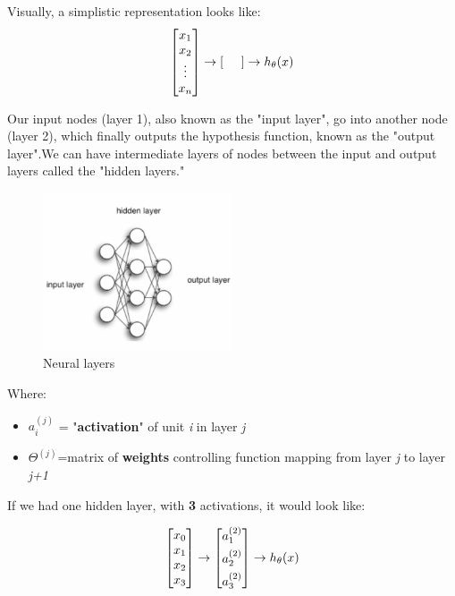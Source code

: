 \pagebreak

Visually, a simplistic representation looks like:\\

\begin{align*}
\begin{bmatrix}
x_{1} \\
x_{2} \\
\vdots \\
x_{n}
\end{bmatrix}
\rightarrow
[ \hspace{0.5cm}]
\rightarrow  h_\theta (x)
\end{align*}

Our input nodes (layer 1), also known as the "input layer", go into another node (layer 2), which finally outputs the hypothesis function, known as the "output layer".We can have intermediate layers of nodes between the input and output layers called the "hidden layers."

\begin{figure}[h!]
	\centering
	\includegraphics[width=0.5\textwidth]{fig/neural_net}
	\caption{Neural layers}
\end{figure}

Where:

\begin{itemize}
\item $ a^{(j)}_i $ = "\textbf{activation}" of unit \textit{i} in layer \textit{j}\\
\item $\Theta ^{(j)} $=matrix of \textbf{weights} controlling function mapping from layer \textit{j} to layer \textit{j+1}
\end{itemize}

If we had one hidden layer, with \textbf{3} activations,  it would look like:

\begin{align*}
\begin{bmatrix}
x_{0}\\
x_{1} \\
x_{2} \\
x_{3}
\end{bmatrix}
\rightarrow
\begin{bmatrix}
\vspace{0.15cm}a_{1}^{(2)}\\\vspace{0.15cm}
a_{2}^{(2)} \\
a_{3}^{(2)}
\end{bmatrix}
\rightarrow  h_\theta (x)
\end{align*}

